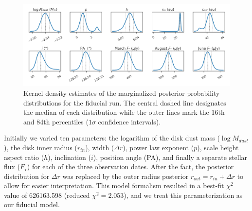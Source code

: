 \documentclass[modern]{aastex62}
\begin{document}
\begin{figure}
  \centering
  \includegraphics[width=\linewidth]{../figures/fiducial_kde}
  \caption{Kernel density estimates of the marginalized posterior probability distributions for the fiducial run. The central dashed line designates the median of each distribution while the outer lines mark the 16th and 84th percentiles ($1\sigma$ confidence intervals).}
  \label{fig: kde}
\end{figure}

Initially we varied ten parameters: the logarithm of the disk dust mass ($\log M_{dust}$), the disk inner radius ($r_{in}$), width ($\Delta r$), power law exponent ($p$), scale height aspect ratio ($h$), inclination ($i$), position angle (PA), and finally a separate stellar flux ($F_\star$) for each of the three observation dates. 
After the fact, the posterior distribution for $\Delta r$ was replaced by the outer radius posterior $r_{out} = r_{in} + \Delta r$ to allow for easier interpretation.
This model formalism resulted in a best-fit $\chi^2$ value of 626163.598 (reduced $\chi^2=2.053$), and we treat this parameterization as our fiducial model.
\end{document}
